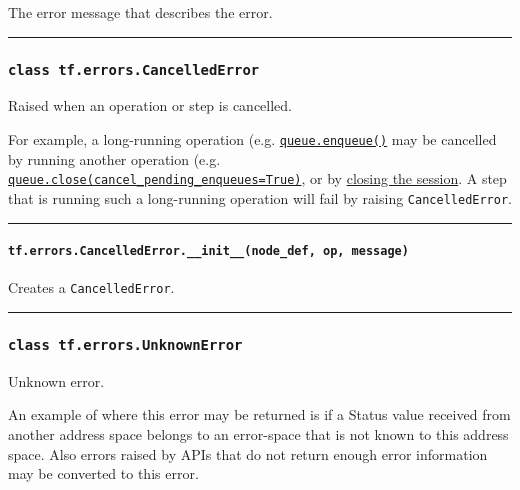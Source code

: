 The error message that describes the error.

\begin{center}\rule{0.5\linewidth}{\linethickness}\end{center}

\subsubsection{\texorpdfstring{\texttt{class\ tf.errors.CancelledError}
}{class tf.errors.CancelledError }}\label{class-tf.errors.cancellederror}

Raised when an operation or step is cancelled.

For example, a long-running operation (e.g.
\href{../../api_docs/python/io_ops.md\#QueueBase.enqueue}{\texttt{queue.enqueue()}}
may be cancelled by running another operation (e.g.
\href{../../api_docs/python/io_ops.md\#QueueBase.close}{\texttt{queue.close(cancel\_pending\_enqueues=True)}},
or by \href{../../api_docs/python/client.md\#Session.close}{closing the
session}. A step that is running such a long-running operation will fail
by raising \texttt{CancelledError}.

\begin{center}\rule{0.5\linewidth}{\linethickness}\end{center}

\paragraph{\texorpdfstring{\texttt{tf.errors.CancelledError.\_\_init\_\_(node\_def,\ op,\ message)}
}{tf.errors.CancelledError.\_\_init\_\_(node\_def, op, message) }}\label{tf.errors.cancellederror.ux5fux5finitux5fux5fnodeux5fdef-op-message}

Creates a \texttt{CancelledError}.

\begin{center}\rule{0.5\linewidth}{\linethickness}\end{center}

\subsubsection{\texorpdfstring{\texttt{class\ tf.errors.UnknownError}
}{class tf.errors.UnknownError }}\label{class-tf.errors.unknownerror}

Unknown error.

An example of where this error may be returned is if a Status value
received from another address space belongs to an error-space that is
not known to this address space. Also errors raised by APIs that do not
return enough error information may be converted to this error.

